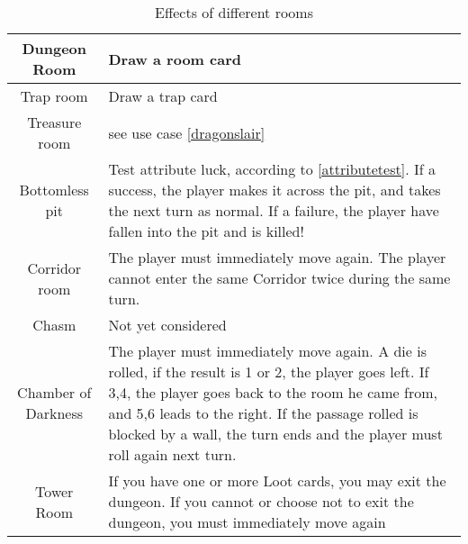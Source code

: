 \begin{table}
\caption{Effects of different rooms}
\label{roomeffects}
\begin{tabular}{|c| p{9cm} |}
\hline
Dungeon Room & Draw a room card \\\hline
Trap room & Draw a trap card \\\hline
Treasure room & see use case \ref{dragonslair} \\\hline
Bottomless pit & Test attribute luck, according to \ref{attributetest}. If a success, the player makes it across the pit, and takes the next turn as normal. If a failure, the player have fallen into the pit and is killed! \\\hline
Corridor room & The player must immediately move again. The player cannot enter the same Corridor twice during the same turn.\\\hline
Chasm & Not yet considered \\ \hline
Chamber of Darkness & The player must immediately move again. A die is rolled, if the result is 1 or 2, the player goes left. If 3,4, the player goes back to the room he came from, and 5,6 leads to the right. If the passage rolled is blocked by a wall, the turn ends and the player must roll again next turn.\\\hline
Tower Room & If you have one or more Loot cards, you may exit the dungeon. If you cannot or choose not to exit the dungeon, you must immediately move again \\

\hline
\end{tabular}
\end{table}

\newpage
